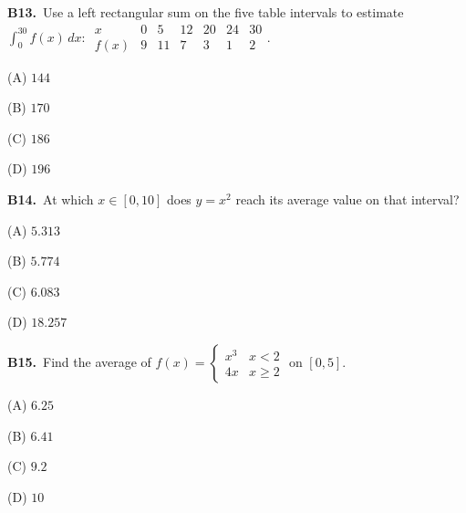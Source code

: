\documentclass[11pt]{article}
\begin{document}
\bigskip\noindent\textbf{B13.}\ Use a left rectangular sum on the five table intervals to estimate $\int_0^{30}f(x)\,dx$: $\begin{array}{c|rrrrrr}x&0&5&12&20&24&30\\\hline f(x)&9&11&7&3&1&2\end{array}$.
\begin{list}{}{\setlength{\leftmargin}{3em}\setlength{\labelwidth}{2.5em}\setlength{\itemsep}{0pt}\setlength{\topsep}{2pt}}
\item[(A)] $144$
\item[(B)] $170$
\item[(C)] $186$
\item[(D)] $196$
\end{list}

\bigskip\noindent\textbf{B14.}\ At which $x\in[0,10]$ does $y=x^2$ reach its average value on that interval?
\begin{list}{}{\setlength{\leftmargin}{3em}\setlength{\labelwidth}{2.5em}\setlength{\itemsep}{0pt}\setlength{\topsep}{2pt}}
\item[(A)] $5.313$
\item[(B)] $5.774$
\item[(C)] $6.083$
\item[(D)] $18.257$
\end{list}

\bigskip\noindent\textbf{B15.}\ Find the average of $f(x)=\begin{cases}x^3&x<2\\4x&x\geq2\end{cases}$ on $[0,5]$.
\begin{list}{}{\setlength{\leftmargin}{3em}\setlength{\labelwidth}{2.5em}\setlength{\itemsep}{0pt}\setlength{\topsep}{2pt}}
\item[(A)] $6.25$
\item[(B)] $6.41$
\item[(C)] $9.2$
\item[(D)] $10$
\end{list}
\end{document}

